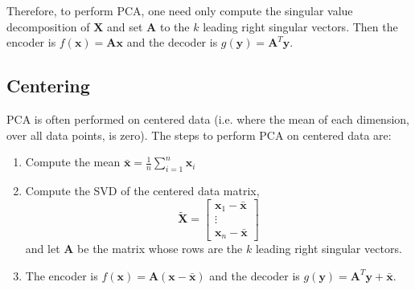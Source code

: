 \documentclass[]{article}
\newcommand{\reals}{\mathbb{R}}
\DeclareMathOperator*{\argmin}{arg\,min}
\begin{document}
Therefore, to perform PCA, one need only compute the singular value decomposition of $\mathbf{X}$ and set $\mathbf{A}$ to the $k$ leading right singular vectors.
Then the encoder is $f(\mathbf{x}) = \mathbf{A} \mathbf{x}$ and the decoder is $g(\mathbf{y}) = \mathbf{A}^T \mathbf{y}$.

\subsection{Centering}
PCA is often performed on centered data (i.e. where the mean of each dimension, over all data points, is zero).
The steps to perform PCA on centered data are:
\begin{enumerate}
\item
Compute the mean $\bar{\mathbf{x}} = \frac{1}{n} \sum_{i=1}^n \mathbf{x}_i$
\item
Compute the SVD of the centered data matrix,
$$ \tilde{\mathbf{X}} = \begin{bmatrix} \mathbf{x}_1 - \bar{\mathbf{x}} \\ \vdots \\ \mathbf{x}_n - \bar{\mathbf{x}} \end{bmatrix} $$
and let $\mathbf{A}$ be the matrix whose rows are the $k$ leading right singular vectors.
\item
The encoder is $f(\mathbf{x}) = \mathbf{A}(\mathbf{x} - \bar{\mathbf{x}})$ and the decoder is $g(\mathbf{y}) = \mathbf{A}^T \mathbf{y} + \bar{\mathbf{x}}$.
\end{enumerate}


%
%
\end{document}

